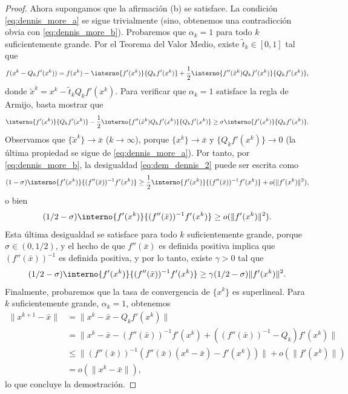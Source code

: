 \begin{proof}
    Ahora supongamos que la afirmación (b) se satisface. La condición \eqref{eq:dennis_more_a} se sigue trivialmente (sino, obtenemos una contradicción obvia con \eqref{eq:dennis_more_b}). 
    Probaremos que $\alpha_k = 1$ para todo $k$ suficientemente grande. Por el Teorema del Valor Medio, existe $\tilde{t}_k \in [0, 1]$ tal que
    \[
        f(x^k - Q_k f'(x^k)) = f(x^k) - \interno{f'(x^k)}{Q_k f'(x^k)} + \frac{1}{2}\interno{f''(\tilde{x}^k)Q_k f'(x^k)}{Q_k f'(x^k)},
    \]
    donde $\tilde{x}^k = x^k - \tilde{t}_k Q_k f'(x^k)$. Para verificar que $\alpha_k = 1$ satisface la regla de Armijo, basta mostrar que
    \begin{equation}
        \interno{f'(x^k)}{Q_k f'(x^k)} - \frac{1}{2}\interno{f''(\tilde{x}^k)Q_k f'(x^k)}{Q_k f'(x^k)} \ge \sigma \interno{f'(x^k)}{Q_k f'(x^k)}.
        \label{eq:dem_dennis_2}
    \end{equation}
    Observamos que $\{\tilde{x}^k\} \to \bar{x}$ ($k \to \infty$), porque $\{x^k\} \to \bar{x}$ y $\{Q_k f'(x^k)\} \to 0$ (la última propiedad se sigue de \eqref{eq:dennis_more_a}). Por tanto, por \eqref{eq:dennis_more_b}, la desigualdad \eqref{eq:dem_dennis_2} puede ser escrita como
    \[
        (1 - \sigma)\interno{f'(x^k)}{(f''(\bar{x}))^{-1} f'(x^k)} \ge \frac{1}{2}\interno{f'(x^k)}{(f''(\bar{x}))^{-1} f'(x^k)} + o(\|f'(x^k)\|^2),
    \]
    o bien
    \[
        (1/2 - \sigma)\interno{f'(x^k)}{(f''(\bar{x}))^{-1} f'(x^k)} \ge o(\|f'(x^k)\|^2).
    \]
    Esta última desigualdad se satisface para todo $k$ suficientemente grande, porque $\sigma \in (0, 1/2)$, y el hecho de que $f''(\bar{x})$ es definida positiva implica que $(f''(\bar{x}))^{-1}$ es definida positiva, y por lo tanto, existe $\gamma > 0$ tal que
    \[
        (1/2 - \sigma)\interno{f'(x^k)}{(f''(\bar{x}))^{-1} f'(x^k)} \ge \gamma (1/2 - \sigma) \|f'(x^k)\|^2.
    \]
    Finalmente, probaremos que la tasa de convergencia de $\{x^k\}$ es superlineal. Para $k$ suficientemente grande, $\alpha_k = 1$, obtenemos
    \begin{align*}
        \|x^{k+1} - \bar{x}\| &= \|x^k - \bar{x} - Q_k f'(x^k)\| \\
        &= \|x^k - \bar{x} - (f''(\bar{x}))^{-1}f'(x^k) + ((f''(\bar{x}))^{-1} - Q_k)f'(x^k)\| \\
        &\le \|(f''(\bar{x}))^{-1}(f''(\bar{x})(x^k - \bar{x}) - f'(x^k))\| + o(\|f'(x^k)\|) \\
        &= o(\|x^k - \bar{x}\|),
    \end{align*}
    lo que concluye la demostración.
\end{proof}

